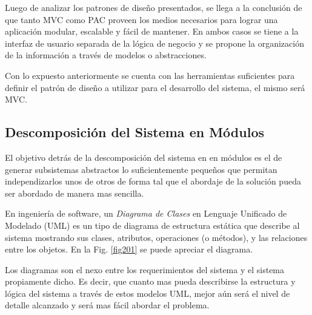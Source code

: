 \documentclass[11pt,oneside]{book}
\begin{document}
Luego de analizar los patrones de diseño presentados, se llega a la conclusión de que tanto MVC como PAC proveen los medios necesarios para lograr una aplicación modular, escalable y fácil de mantener. En ambos casos se tiene a la interfaz de usuario separada de la lógica de negocio y se propone la organización de la información a través de modelos o abstracciones.


Con lo expuesto anteriormente se cuenta con las herramientas suficientes para definir el patrón de diseño a utilizar para el desarrollo del sistema, el mismo será MVC.

\subsection{Descomposición del Sistema en Módulos}
El objetivo detrás de la descomposición del sistema en en módulos es el de generar subsistemas abstractos lo suficientemente pequeños que permitan independizarlos unos de otros de forma tal que el abordaje de la solución pueda ser abordado de manera mas sencilla.

En ingeniería de software, un \textit{Diagrama de Clases} en Lenguaje Unificado de Modelado (UML) es un tipo de diagrama de estructura estática que describe al sistema mostrando sus clases, atributos, operaciones (o métodos), y las relaciones entre los objetos. En la Fig. \eqref{fig201} se puede apreciar el diagrama.

Los diagramas son el nexo entre los requerimientos del sistema y el sistema propiamente dicho. Es decir, que cuanto mas pueda describirse la estructura y lógica del sistema a través de estos modelos UML, mejor aún será el nivel de detalle alcanzado y será mas fácil abordar el problema.
\end{document}
